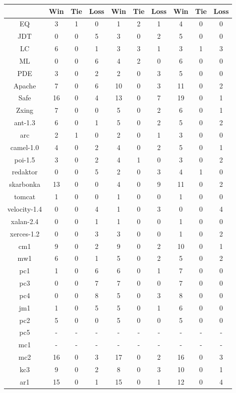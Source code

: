 \begin{table}[!t]
\begin{tabular}{|@{}c@{}||@{}c@{}|@{}c@{}|@{}c@{}||@{}c@{}|@{}c@{}|@{}c@{}||@{}c@{}|@{}c@{}|@{}c@{}|}
& Win & Tie & Loss & Win & Tie & Loss & Win & Tie & Loss \\ \hline \hline
EQ	&3	&1 	&0	&1	&2 	&1	&4	&0 	&0\\ \hline
JDT	&0	&0 	&5	&3	&0 	&2	&5	&0 	&0\\ \hline
LC	&6	&0 	&1	&3	&3 	&1	&3	&1 	&3\\ \hline
ML	&0	&0 	&6	&4	&2 	&0	&6	&0 	&0\\ \hline
PDE	&3	&0 	&2	&2	&0 	&3	&5	&0 	&0\\ \hline
Apache	&7	&0 	&6	&10	&0 	&3	&11	&0 	&2\\ \hline
Safe	&16	&0 	&4	&13	&0 	&7	&19	&0 	&1\\ \hline
Zxing	&7	&0 	&0	&5	&0 	&2	&6	&0 	&1\\ \hline
ant-1.3	&6	&0 	&1	&5	&0 	&2	&5	&0 	&2\\ \hline
arc	&2	&1 	&0	&2	&0 	&1	&3	&0 	&0\\ \hline
camel-1.0	&4	&0 	&2	&4	&0 	&2	&5	&0 	&1\\ \hline
poi-1.5	&3	&0 	&2	&4	&1 	&0	&3	&0 	&2\\ \hline
redaktor	&0	&0 	&5	&2	&0 	&3	&4	&1 	&0\\ \hline
skarbonka	&13	&0 	&0	&4	&0 	&9	&11	&0 	&2\\ \hline
tomcat	&1	&0 	&0	&1	&0 	&0	&1	&0 	&0\\ \hline
velocity-1.4	&0	&0 	&4	&1	&0 	&3	&0	&0 	&4\\ \hline
xalan-2.4	&0	&0 	&1	&1	&0 	&0	&1	&0 	&0\\ \hline
xerces-1.2	&0	&0 	&3	&3	&0 	&0	&1	&0 	&2\\ \hline
cm1	&9	&0 	&2	&9	&0 	&2	&10	&0 	&1\\ \hline
mw1	&6	&0 	&1	&5	&0 	&2	&5	&0 	&2\\ \hline
pc1	&1	&0 	&6	&6	&0 	&1	&7	&0 	&0\\ \hline
pc3	&0	&0 	&7	&7	&0 	&0	&7	&0 	&0\\ \hline
pc4	&0	&0 	&8	&5	&0 	&3	&8	&0 	&0\\ \hline
jm1	&1	&0 	&5	&5	&0 	&1	&6	&0 	&0\\ \hline
pc2	&5	&0 	&0	&5	&0 	&0	&5	&0 	&0\\ \hline
pc5	&-	&-	&-	&-	&-	&-	&-	&-	&-\\ \hline
mc1	&-	&-	&-	&-	&-	&-	&-	&-	&-\\ \hline
mc2	&16	&0 	&3	&17	&0 	&2	&16	&0 	&3\\ \hline
kc3	&9	&0 	&2	&8	&0 	&3	&10	&0 	&1\\ \hline
ar1	&15	&0 	&1	&15	&0 	&1	&12	&0 	&4\\ \hline

\end{tabular}
\end{table}
